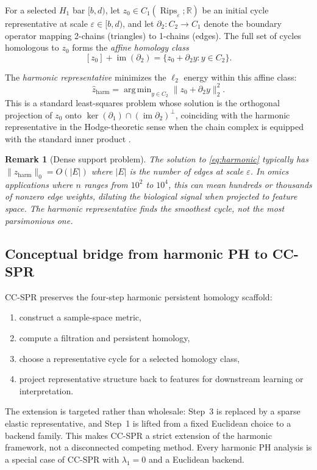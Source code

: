 \documentclass[11pt]{article}
\newtheorem{remark}[theorem]{Remark}
\DeclareMathOperator{\Rips}{Rips}
\DeclareMathOperator*{\argmin}{arg\,min}
\begin{document}
For a selected $H_1$ bar $[b, d)$, let $z_0 \in C_1(\Rips_\varepsilon; \mathbb{R})$ be an initial cycle representative at scale $\varepsilon \in [b, d)$, and let $\partial_2 : C_2 \to C_1$ denote the boundary operator mapping 2-chains (triangles) to 1-chains (edges).
The full set of cycles homologous to $z_0$ forms the \emph{affine homology class}
\begin{equation}\label{eq:affine}
[z_0] + \operatorname{im}(\partial_2) = \{z_0 + \partial_2 y : y \in C_2\}.
\end{equation}

The \emph{harmonic representative} minimizes the $\ell_2$ energy within this affine class:
\begin{equation}\label{eq:harmonic}
\hat{z}_{\mathrm{harm}} = \argmin_{y \in C_2} \| z_0 + \partial_2 y \|_2^2.
\end{equation}
This is a standard least-squares problem whose solution is the orthogonal projection of $z_0$ onto $\ker(\partial_1) \cap (\operatorname{im} \partial_2)^\perp$, coinciding with the harmonic representative in the Hodge-theoretic sense when the chain complex is equipped with the standard inner product \cite{basuCoxHPH2024, friedman1998}.

\begin{remark}[Dense support problem]\label{rem:dense}
The solution to \eqref{eq:harmonic} typically has $\|\hat{z}_{\mathrm{harm}}\|_0 = O(|E|)$ where $|E|$ is the number of edges at scale $\varepsilon$.
In omics applications where $n$ ranges from $10^2$ to $10^4$, this can mean hundreds or thousands of nonzero edge weights, diluting the biological signal when projected to feature space.
The harmonic representative finds the smoothest cycle, not the most parsimonious one.
\end{remark}

\subsection{Conceptual bridge from harmonic PH to CC-SPR}

CC-SPR preserves the four-step harmonic persistent homology scaffold:
\begin{enumerate}[leftmargin=1.5em]
\item construct a sample-space metric,
\item compute a filtration and persistent homology,
\item choose a representative cycle for a selected homology class,
\item project representative structure back to features for downstream learning or interpretation.
\end{enumerate}
The extension is targeted rather than wholesale: Step~3 is replaced by a sparse elastic representative, and Step~1 is lifted from a fixed Euclidean choice to a backend family.
This makes CC-SPR a strict extension of the harmonic framework, not a disconnected competing method.
Every harmonic PH analysis is a special case of CC-SPR with $\lambda_1 = 0$ and a Euclidean backend.
\end{document}
